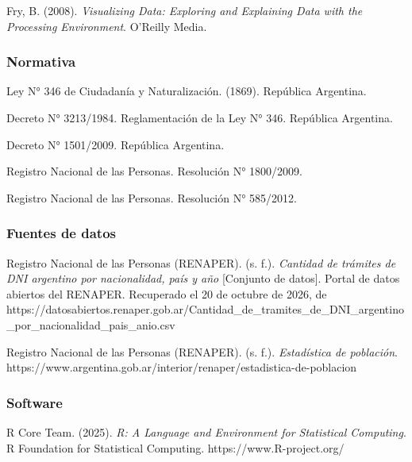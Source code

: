 \documentclass[
  letterpaper,
  DIV=11,
  numbers=noendperiod]{scrartcl}
\begin{document}
Fry, B. (2008). \emph{Visualizing Data: Exploring and Explaining Data
with the Processing Environment}. O'Reilly Media.

\subsubsection{Normativa}\label{normativa}

Ley N° 346 de Ciudadanía y Naturalización. (1869). República Argentina.

Decreto N° 3213/1984. Reglamentación de la Ley N° 346. República
Argentina.

Decreto N° 1501/2009. República Argentina.

Registro Nacional de las Personas. Resolución N° 1800/2009.

Registro Nacional de las Personas. Resolución N° 585/2012.

\subsubsection{Fuentes de datos}\label{fuentes-de-datos}

Registro Nacional de las Personas (RENAPER). (s. f.). \emph{Cantidad de
trámites de DNI argentino por nacionalidad, país y año} {[}Conjunto de
datos{]}. Portal de datos abiertos del RENAPER. Recuperado el 20 de
octubre de 2026, de
https://datosabiertos.renaper.gob.ar/Cantidad\_de\_tramites\_de\_DNI\_argentino\_por\_nacionalidad\_pais\_anio.csv

Registro Nacional de las Personas (RENAPER). (s. f.). \emph{Estadística
de población}.
https://www.argentina.gob.ar/interior/renaper/estadistica-de-poblacion

\subsubsection{Software}\label{software}

R Core Team. (2025). \emph{R: A Language and Environment for Statistical
Computing}. R Foundation for Statistical Computing.
https://www.R-project.org/
\end{document}

